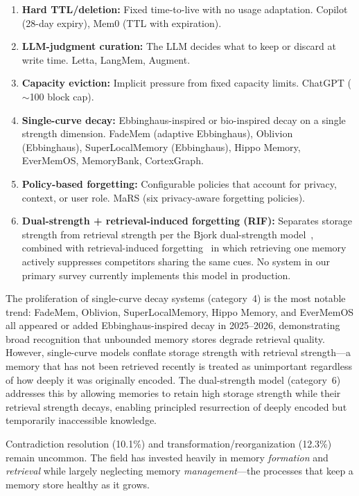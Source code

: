 \begin{enumerate}[leftmargin=*, nosep]
  \item \textbf{Hard TTL/deletion:} Fixed time-to-live with no usage
    adaptation. Copilot (28-day expiry), Mem0 (TTL with expiration).
  \item \textbf{LLM-judgment curation:} The LLM decides what to keep or
    discard at write time. Letta, LangMem, Augment.
  \item \textbf{Capacity eviction:} Implicit pressure from fixed capacity
    limits. ChatGPT (${\sim}$100 block cap).
  \item \textbf{Single-curve decay:} Ebbinghaus-inspired or bio-inspired
    decay on a single strength dimension. FadeMem (adaptive Ebbinghaus),
    Oblivion (Ebbinghaus), SuperLocalMemory (Ebbinghaus), Hippo Memory,
    EverMemOS, MemoryBank, CortexGraph.
  \item \textbf{Policy-based forgetting:} Configurable policies that
    account for privacy, context, or user role. MaRS (six privacy-aware
    forgetting policies).
  \item \textbf{Dual-strength + retrieval-induced forgetting (RIF):}
    Separates storage strength from retrieval strength per the Bjork
    dual-strength model~\cite{bjork1992}, combined with retrieval-induced
    forgetting~\cite{anderson1994} in which retrieving one memory actively
    suppresses competitors sharing the same cues. No system in our
    primary survey currently implements this model in production.
\end{enumerate}

\noindent
The proliferation of single-curve decay systems (category~4) is the most
notable trend: FadeMem, Oblivion, SuperLocalMemory, Hippo Memory, and
EverMemOS all appeared or added Ebbinghaus-inspired decay in 2025--2026,
demonstrating broad recognition that unbounded memory stores degrade
retrieval quality. However, single-curve models conflate storage strength
with retrieval strength---a memory that has not been retrieved recently is
treated as unimportant regardless of how deeply it was originally encoded.
The dual-strength model (category~6) addresses this by allowing memories to
retain high storage strength while their retrieval strength decays, enabling
principled resurrection of deeply encoded but temporarily inaccessible
knowledge.

Contradiction resolution (10.1\%) and transformation/reorganization
(12.3\%) remain uncommon. The field has invested heavily in memory
\emph{formation} and \emph{retrieval} while largely neglecting memory
\emph{management}---the processes that keep a memory store healthy as it grows.

